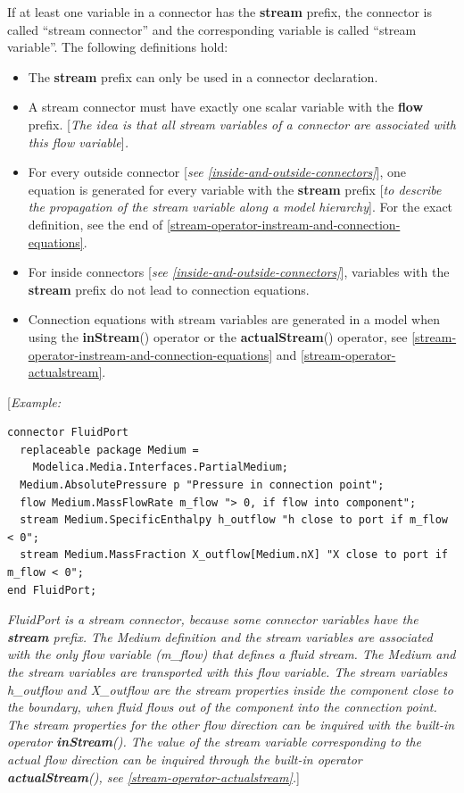 \documentclass[10pt,a4paper]{report}
\begin{document}
If at least one variable in a connector has the \textbf{stream} prefix,
the connector is called ``stream connector'' and the corresponding
variable is called ``stream variable''. The following definitions hold:

\begin{itemize}
\item
  The \textbf{stream} prefix can only be used in a connector
  declaration.
\item
  A stream connector must have exactly one scalar variable with the
  \textbf{flow} prefix. {[}\emph{The idea is that all stream variables
  of a connector are associated with this flow variable}{]}\emph{.}
\item
  For every outside connector {[}\emph{see \ref{inside-and-outside-connectors}}{]}, one
  equation is generated for every variable with the \textbf{stream}
  prefix {[}\emph{to describe the propagation of the stream variable
  along a model hierarchy}{]}. For the exact definition, see the end of
  \ref{stream-operator-instream-and-connection-equations}.
\item
  For inside connectors {[}\emph{see \ref{inside-and-outside-connectors}}{]}, variables
  with the \textbf{stream} prefix do not lead to connection equations.
\item
  Connection equations with stream variables are generated in a model
  when using the \textbf{inStream}() operator or the
  \textbf{actualStream}() operator, see \ref{stream-operator-instream-and-connection-equations}
  and \ref{stream-operator-actualstream}.
\end{itemize}

{[}\emph{Example:}

\begin{lstlisting}[language=modelica]
connector FluidPort
  replaceable package Medium =
    Modelica.Media.Interfaces.PartialMedium;
  Medium.AbsolutePressure p "Pressure in connection point";
  flow Medium.MassFlowRate m_flow "> 0, if flow into component";
  stream Medium.SpecificEnthalpy h_outflow "h close to port if m_flow < 0";
  stream Medium.MassFraction X_outflow[Medium.nX] "X close to port if m_flow < 0";
end FluidPort;
\end{lstlisting}
\emph{FluidPort is a stream connector, because some connector variables
have the \textbf{stream} prefix. The Medium definition and the stream
variables are associated with the only flow variable (m\_flow) that
defines a fluid stream. The Medium and the stream variables are
transported with this flow variable. The stream variables h\_outflow and
X\_outflow are the stream properties inside the component close to the
boundary, when fluid flows out of the component into the connection
point. The stream properties for the other flow direction can be
inquired with the built-in operator \textbf{inStream}(). The value of
the stream variable corresponding to the actual flow direction can be
inquired through the built-in operator \textbf{actualStream}(), see
\ref{stream-operator-actualstream}.}{]}
\end{document}

